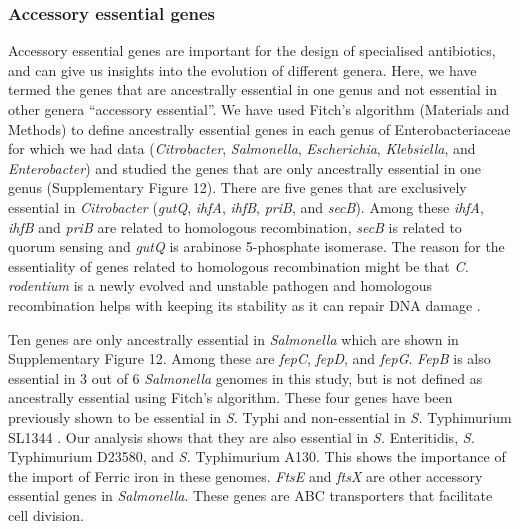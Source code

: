\documentclass[12pt,letterpaper]{article}
\begin{document}
\subsubsection{Accessory essential genes}
Accessory essential genes are important for the design of specialised antibiotics, and can give us insights into the evolution of different genera. Here, we have termed the genes that are ancestrally essential in one genus and not essential in other genera ``accessory essential''. We have used Fitch's algorithm (Materials and Methods) to define ancestrally essential genes in each genus of Enterobacteriaceae for which we had data (\textit{Citrobacter}, \textit{Salmonella}, \textit{Escherichia}, \textit{Klebsiella}, and \textit{Enterobacter}) and studied the genes that are only ancestrally essential in one genus (Supplementary Figure 12). There are five genes that are exclusively essential in \textit{Citrobacter} (\textit{gutQ}, \textit{ihfA}, \textit{ihfB}, \textit{priB}, and \textit{secB}). Among these \textit{ihfA}, \textit{ihfB} and \textit{priB} are related to homologous recombination, \textit{secB} is related to quorum sensing and \textit{gutQ} is arabinose 5-phosphate isomerase. The reason for the essentiality of genes related to homologous recombination might be that \textit{C. rodentium} is a newly evolved and unstable pathogen \cite{petty_citrobacter_2011} and homologous recombination helps with keeping its stability as it can repair DNA damage \cite{darmon_bacterial_2014}.

Ten genes are only ancestrally essential in \textit{Salmonella} which are shown in Supplementary Figure 12. Among these are \textit{fepC}, \textit{fepD}, and \textit{fepG}. \textit{FepB} is also essential in 3 out of 6 \textit{Salmonella} genomes in this study, but is not defined as ancestrally essential using Fitch's algorithm. These four genes have been previously shown to be essential in \textit{S.} Typhi and non-essential in \textit{S.} Typhimurium SL1344 \cite{barquist_comparison_2013}. Our analysis shows that they are also essential in \textit{S.} Enteritidis, \textit{S.} Typhimurium D23580, and \textit{S.} Typhimurium A130. This shows the importance of the import of Ferric iron in these genomes. \textit{FtsE} and \textit{ftsX} are other accessory essential genes in \textit{Salmonella}. These genes are ABC transporters that facilitate cell division.%
\end{document}
